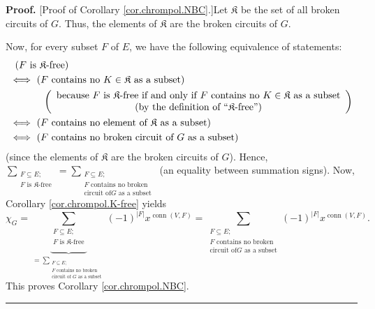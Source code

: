 \documentclass[numbers=enddot,12pt,final,onecolumn,notitlepage]{scrartcl}%
\theoremstyle{definition}
\newenvironment{proof}[1][Proof]{\noindent\textbf{#1.} }{\ \rule{0.5em}{0.5em}}
\newenvironment{verlong}{}{}
\let\sumnonlimits\sum
\renewcommand{\sum}{\sumnonlimits\limits}
\begin{document}
\begin{verlong}
\begin{proof}
[Proof of Corollary \ref{cor.chrompol.NBC}.]Let $\mathfrak{K}$ be the set of
all broken circuits of $G$. Thus, the elements of $\mathfrak{K}$ are the
broken circuits of $G$.

Now, for every subset $F$ of $E$, we have the following equivalence of
statements:%
\begin{align*}
&  \ \left(  F\text{ is }\mathfrak{K}\text{-free}\right) \\
&  \Longleftrightarrow\ \left(  F\text{ contains no }K\in\mathfrak{K}\text{ as
a subset}\right) \\
&  \ \ \ \ \ \ \ \ \ \ \left(
\begin{array}
[c]{c}%
\text{because }F\text{ is }\mathfrak{K}\text{-free if and only if }F\text{
contains no }K\in\mathfrak{K}\text{ as a subset}\\
\text{(by the definition of \textquotedblleft}\mathfrak{K}%
\text{-free\textquotedblright)}%
\end{array}
\right) \\
&  \Longleftrightarrow\ \left(  F\text{ contains no element of }%
\mathfrak{K}\text{ as a subset}\right) \\
&  \Longleftrightarrow\ \left(  F\text{ contains no broken circuit of }G\text{
as a subset}\right)
\end{align*}
(since the elements of $\mathfrak{K}$ are the broken circuits of $G$). Hence,
$\sum_{\substack{F\subseteq E;\\F\text{ is }\mathfrak{K}\text{-free}}%
}=\sum_{\substack{F\subseteq E;\\F\text{ contains no broken}\\\text{circuit of
}G\text{ as a subset}}}$ (an equality between summation signs). Now, Corollary
\ref{cor.chrompol.K-free} yields%
\[
\chi_{G}=\underbrace{\sum_{\substack{F\subseteq E;\\F\text{ is }%
\mathfrak{K}\text{-free}}}}_{=\sum_{\substack{F\subseteq E;\\F\text{ contains
no broken}\\\text{circuit of }G\text{ as a subset}}}}\left(  -1\right)
^{\left\vert F\right\vert }x^{\operatorname*{conn}\left(  V,F\right)  }%
=\sum_{\substack{F\subseteq E;\\F\text{ contains no broken}\\\text{circuit of
}G\text{ as a subset}}}\left(  -1\right)  ^{\left\vert F\right\vert
}x^{\operatorname*{conn}\left(  V,F\right)  }.
\]
This proves Corollary \ref{cor.chrompol.NBC}.
\end{proof}
\end{verlong}
\end{document}
